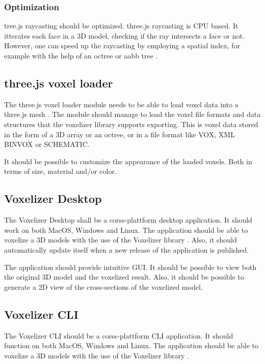 \subsubsection{Optimization}
tree.js raycasting should be optimized. three.js raycasting is CPU based. It itterates each face in a 3D model, checking if the ray intersects a face or not. However, one can speed up the raycasting by employing a spatial index, for example with the help of an octree \cite{octree} or aabb tree .

\subsection{three.js voxel loader}
The three.js voxel loader module needs to be able to load voxel data into a three.js mesh \cite{three.js-mesh}. The module should manage to load the voxel file formats and data structures that the voxelizer library supports exporting. This is voxel data stored in the form of a 3D array or an octree, or in a file format like VOX, XML BINVOX or SCHEMATIC.

It should be possible to customize the appearance of the loaded voxels. Both in terms of size, material and/or color.

\subsection{Voxelizer Desktop}
The Voxelizer Desktop shall be a corss-plattform \cite{cross-platform} desktop application. It should work on both MacOS, Windows and Linux. The application should be able to voxelize a 3D models with the use of the Voxelizer library \cite{voxelizer}. Also, it should automatically update itself when a new release of the application is published.

The application should provide intuitive GUI. It should be possible to view both the original 3D model and the voxelized result. Also, it should be possible to generate a 2D view of the cross-sections of the voxelized model.

\subsection{Voxelizer CLI}
The Voxelizer CLI should be a corss-plattform \cite{cross-platform} CLI application. It should function on both MacOS, Windows and Linux. The application should be able to voxelize a 3D models with the use of the Voxelizer library \cite{voxelizer}.

